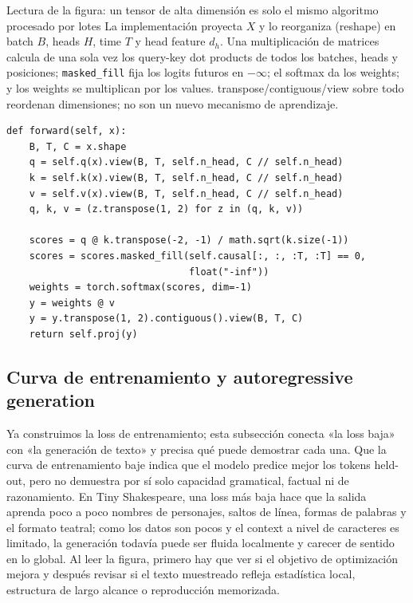\documentclass[a4paper]{article}
\begin{document}
\begin{knowledgebox}{Lectura de la figura: un tensor de alta dimensión es solo el mismo algoritmo procesado por lotes}
La implementación proyecta $X$ y lo reorganiza (reshape) en batch $B$, heads $H$, time $T$ y head feature $d_h$. Una multiplicación de matrices calcula de una sola vez los query-key dot products de todos los batches, heads y posiciones; \texttt{masked\_fill} fija los logits futuros en $-\infty$; el softmax da los weights; y los weights se multiplican por los values. transpose/contiguous/view sobre todo reordenan dimensiones; no son un nuevo mecanismo de aprendizaje.
\end{knowledgebox}

\begin{lstlisting}[caption={Forward mínimo de causal self-attention con anotaciones de forma.}]
def forward(self, x):
    B, T, C = x.shape
    q = self.q(x).view(B, T, self.n_head, C // self.n_head)
    k = self.k(x).view(B, T, self.n_head, C // self.n_head)
    v = self.v(x).view(B, T, self.n_head, C // self.n_head)
    q, k, v = (z.transpose(1, 2) for z in (q, k, v))

    scores = q @ k.transpose(-2, -1) / math.sqrt(k.size(-1))
    scores = scores.masked_fill(self.causal[:, :, :T, :T] == 0,
                                float("-inf"))
    weights = torch.softmax(scores, dim=-1)
    y = weights @ v
    y = y.transpose(1, 2).contiguous().view(B, T, C)
    return self.proj(y)
\end{lstlisting}

\subsection{Curva de entrenamiento y autoregressive generation}

Ya construimos la loss de entrenamiento; esta subsección conecta «la loss baja» con «la generación de texto» y precisa qué puede demostrar cada una. Que la curva de entrenamiento baje indica que el modelo predice mejor los tokens held-out, pero no demuestra por sí solo capacidad gramatical, factual ni de razonamiento. En Tiny Shakespeare, una loss más baja hace que la salida aprenda poco a poco nombres de personajes, saltos de línea, formas de palabras y el formato teatral; como los datos son pocos y el context a nivel de caracteres es limitado, la generación todavía puede ser fluida localmente y carecer de sentido en lo global. Al leer la figura, primero hay que ver si el objetivo de optimización mejora y después revisar si el texto muestreado refleja estadística local, estructura de largo alcance o reproducción memorizada.
\end{document}

